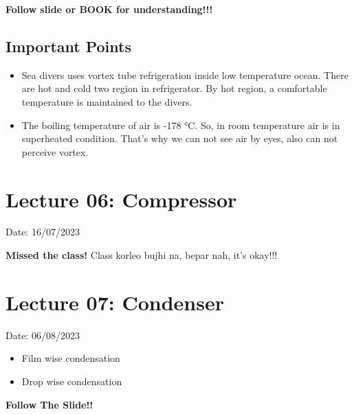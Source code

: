 \documentclass{article}
\begin{document}
\textbf{Follow slide or BOOK for understanding!!!} \\

\subsection*{Important Points}
\begin{itemize}
  \item Sea divers uses vortex tube refrigeration inside low temperature ocean. There are hot and cold two region in refrigerator. By hot region, a comfortable temperature is maintained to the divers. 
  \item The boiling temperature of air is -178 °C. So, in room temperature air is in superheated condition. That's why we can not see air by eyes, also can not perceive vortex. 
\end{itemize}

\section{Lecture 06: Compressor} 
\hfill Date: 16/07/2023 

\textbf{Missed the class!}
Class korleo bujhi na, bepar nah, it's okay!!!

\section{Lecture 07: Condenser} 
\hfill Date: 06/08/2023 

\begin{itemize}
  \item Film wise condensation 
  \item Drop wise condensation
\end{itemize}
\textbf{Follow The Slide!!} 
\end{document}
